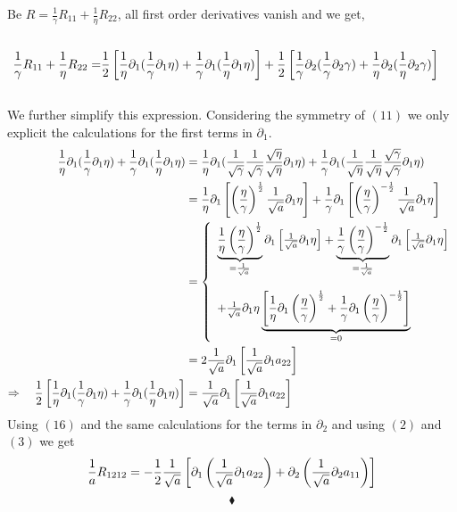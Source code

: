   Be $R = \frac{1}{\gamma}R_{11}+ \frac{1}{\eta}R_{22}$, all first order derivatives vanish and we get,\\\\
  \begin{align}
  \frac{1}{\gamma}R_{11}+ \frac{1}{\eta}R_{22} = & 
 \frac{1}{2} \left[ \frac{1}{\eta}\partial_1(\frac{1}{\gamma}\partial_1 \eta)+ \frac{1}{\gamma} \partial_{1}(\frac{1}{\eta}\partial_{1} \eta)\right]
    + \frac{1}{2}  \left[\frac{1}{\gamma}\partial_{2}(\frac{1}{\gamma}\partial_{2} \gamma)+ \frac{1}{\eta}\partial_2( \frac{1}{\eta}\partial_2 \gamma) \right] 
\end{align}\\
We further simplify this expression. Considering the symmetry of $(11)$ we only explicit the calculations for the first terms in $\partial_1$.
\begin{align}
 \frac{1}{\eta}\partial_1(\frac{1}{\gamma}\partial_1 \eta)+ \frac{1}{\gamma} \partial_{1}(\frac{1}{\eta}\partial_{1} \eta)&=\frac{1}{\eta}\partial_1(\frac{1}{\sqrt{\gamma}}\frac{1}{\sqrt{\gamma}}\frac{\sqrt{\eta}}{\sqrt{\eta}}\partial_1 \eta)+ \frac{1}{\gamma} \partial_{1}(\frac{1}{\sqrt{\eta}}\frac{1}{\sqrt{\eta}}\frac{\sqrt{\gamma}}{\sqrt{\gamma}}\partial_{1} \eta)\\
 &=\frac{1}{\eta}\partial_1\left[\left(\frac{\eta}{\gamma}\right)^{\frac{1}{2}}\frac{1}{\sqrt{a}}\partial_1 \eta\right]+ \frac{1}{\gamma} \partial_{1}\left[\left(\frac{\eta}{\gamma}\right)^{-\frac{1}{2}}\frac{1}{\sqrt{a}}\partial_{1} \eta\right]\\
 &=\left \{ \begin{array}{l}
\underbrace{\frac{1}{\eta}\left(\frac{\eta}{\gamma}\right)^{\frac{1}{2}}}_{= \frac{1}{\sqrt{a}}}\partial_1\left[\frac{1}{\sqrt{a}}\partial_1 \eta\right]+ \underbrace{\frac{1}{\gamma} \left(\frac{\eta}{\gamma}\right)^{-\frac{1}{2}}}_{= \frac{1}{\sqrt{a}}}\partial_{1}\left[\frac{1}{\sqrt{a}}\partial_{1} \eta\right]\\\\
+\frac{1}{\sqrt{a}}\partial_1 \eta\underbrace{\left[\frac{1}{\eta}\partial_1\left(\frac{\eta}{\gamma}\right)^{\frac{1}{2}}+ \frac{1}{\gamma} \partial_{1}\left(\frac{\eta}{\gamma}\right)^{-\frac{1}{2}}\right]}_{=0}
 \end {array}\right.\\
  &= 2\frac{1}{\sqrt{a}}\partial_1\left[\frac{1}{\sqrt{a}}\partial_1 a_{22}\right]\\
  \Rightarrow \quad  \frac{1}{2} \left[ \frac{1}{\eta}\partial_1(\frac{1}{\gamma}\partial_1 \eta) + \frac{1}{\gamma} \partial_{1}(\frac{1}{\eta}\partial_{1} \eta)\right] &=  \frac{1}{\sqrt{a}}\partial_1\left[\frac{1}{\sqrt{a}}\partial_1 a_{22}\right]  
\end{align}
Using $(16)$ and the same calculations for the terms in $\partial_2$ and using $(2)$ and $(3)$ we  get $$\frac{1}{a}R_{1212}= -\frac{1}{2}\frac{1}{\sqrt{a}}\left[\partial_1\left(\frac{1}{\sqrt{a}}\partial_1 a_{22}\right)+\partial_2\left(\frac{1}{\sqrt{a}}\partial_2 a_{11}\right)\right]$$
$$\blacklozenge$$
\newpage

